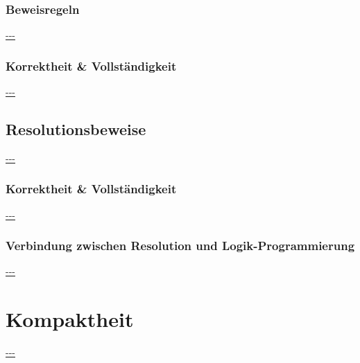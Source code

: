 \documentclass[twocolumn]{article}
\begin{document}
    \subsubsection{Beweisregeln}
    \url{---}\\

    \subsubsection{Korrektheit \& Vollständigkeit}
    \url{---}\\

    \subsection{Resolutionsbeweise}
    \url{---}\\

    \subsubsection{Korrektheit \& Vollständigkeit}
    \url{---}\\

    \subsubsection{Verbindung zwischen Resolution und Logik-Programmierung}
    \url{---}\\

    \section{Kompaktheit}
    \url{---}\\
\end{document}
